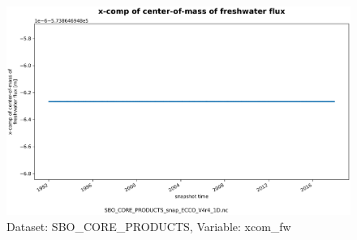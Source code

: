 \begin{figure}[H]
\centering
\includegraphics[scale=0.55]{../images/plots/oneD_plots/SBO_Core_Products/xcom_fw.png}
\caption{Dataset: SBO\_CORE\_PRODUCTS, Variable: xcom\_fw}
\label{tab:table-SBO_CORE_PRODUCTS_xcom_fw-Plot}
\end{figure}
\newpage
\pagebreak
